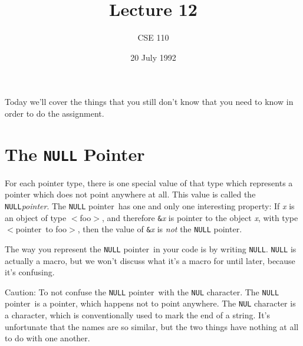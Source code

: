 

\def\brac#1{$<$#1$>$}
\def\Int{{\tt int}}
\def\int{\brac{\Int}}
\def\int{\brac{\Int}}
\def\Shortint{{\tt short~int}}
\def\shortint{\brac{\Shortint}}
\def\Longint{{\tt long~int}}
\def\longint{\brac{\Longint}}
\def\Float{{\tt float}}
\def\float{\brac{\Float}}
\def\Double{{\tt double}}
\def\double{\brac{\Double}}
\def\Char{{\tt char}}
\def\chr{\brac{\Char}}
\def\Void{{\tt void}}
\def\void{\brac{\Void}}

\def\ptr#1{pointer~to #1}
\def\p2#1{\brac{\ptr#1}}
\def\Ano#1#2{array~of {#1}~#2s}
\def\ano#1#2{\brac{\Ano#1#2}}
\def\Ao#1{array~of #1}
\def\ao#1{\brac{\Ao#1}}

\def\np{{\tt NULL} pointer}

\def\breakhere{\mbox{$\otimes$}}
\parskip 8pt


\title{Lecture 12}
\author{CSE 110}
\date{20 July 1992}



\maketitle

Today we'll cover the things that you still don't know that you need to
know in order to do the assignment.

\section{The {\tt NULL} Pointer}

For each pointer type, there is one special value of that type which
represents a pointer which does not point anywhere at all.  This value
is called the {\tt NULL}{\em pointer}\/.  The \np\ has one and only one
interesting property:  If {\em x}\/ is an object of type \brac{foo},
and therefore {\tt\&}{\em x}\/ is pointer to the object {\em x}\/, with
type \p2{foo}, then the value of {\tt\&}{\em x}\/ is {\em not} the \np.

The way you represent the \np\ in your code is by writing {\tt NULL}.
{\tt NULL} is actually a macro, but we won't discuss what it's a macro
for until later, because it's confusing.

Caution:  To not confuse the \np\ with the {\tt NUL} character.  The
\np\ is a pointer, which happens not to point anywhere.  The {\tt NUL}
character is a character, which is conventionally used to mark the end
of a string.  It's unfortunate that the names are so similar, but the
two things have nothing at all to do with one another.

